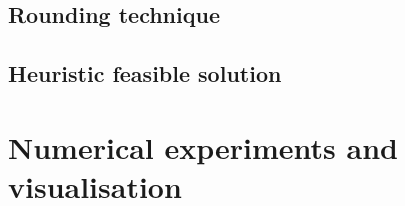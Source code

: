 \begin{bibunit}[ieeetr]
\subsection{Rounding technique}
\subsection{Heuristic feasible solution}

\newpage
\section{Numerical experiments and visualisation}


\newpage
{}
\renewcommand{\bibname}{Bibliography of chapter \thechapter}
\end{bibunit}
